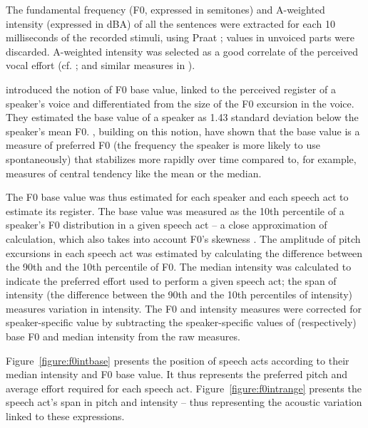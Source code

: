 \documentclass[output=paper]{LSP/langsci}
\begin{document}
The fundamental frequency (F0, expressed in semitones) and A-weighted intensity (expressed in dBA) of all the sentences were extracted for each 10 milliseconds of the recorded stimuli, using Praat \citep{Boersma.praat}; values in unvoiced parts were discarded. A-weighted intensity was selected as a good correlate of the perceived vocal effort (cf. \citealt{lienard2013strength}; and similar measures in \citealt{Traunmuller2000}). 

\citet{Traunmuller1995} introduced the notion of F0 base value, linked to the perceived register of a speaker's voice and differentiated from the size of the F0 excursion in the voice. 
They estimated the base value of a speaker as 1.43 standard deviation below the speaker's mean F0. 
\citet{arantes2014}, building on this notion, have shown that the base value is a measure of preferred F0 (the frequency the speaker is more likely to use spontaneously) that stabilizes more rapidly over time compared to, for example, measures of central tendency like the mean or the median.

The F0 base value was thus estimated for each speaker and each speech act to estimate its register. 
The base value was measured as the 10th percentile of a speaker's F0 distribution in a given speech act -- a close approximation of \citet{Traunmuller1995} calculation, which also takes into account F0's skewness \citep[cf.][for a slightly different choice]{arantes2014}. 
The amplitude of pitch excursions in each speech act was estimated by calculating the difference between the 90th and the 10th percentile of F0. 
The median intensity was calculated to indicate the preferred effort used to perform a given speech act; the span of intensity (the difference between the 90th and the 10th percentiles of intensity) measures variation in intensity.
The F0 and intensity measures were corrected for speaker-specific value by subtracting the speaker-specific values of (respectively) base F0 and median intensity from the raw measures.

Figure~\ref{figure:f0intbase} presents the position of speech acts according to their median intensity and F0 base value. 
It thus represents the preferred pitch and average effort required for each speech act. 
Figure~\ref{figure:f0intrange} presents the speech act's span in pitch and intensity -- thus representing the acoustic variation linked to these expressions.\largerpage[-1]
\end{document}
